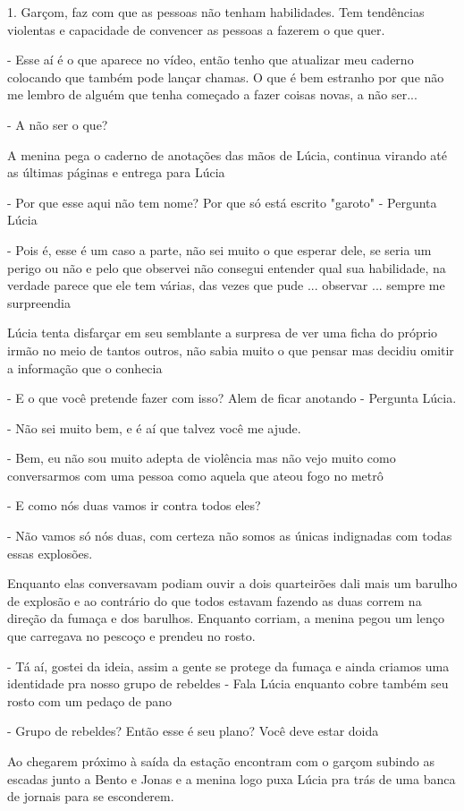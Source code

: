 1. Garçom, faz com que as pessoas não tenham habilidades. Tem tendências violentas e capacidade de convencer as pessoas a fazerem o que quer.

- Esse aí é o que aparece no vídeo, então tenho que atualizar meu caderno colocando que também pode lançar chamas. O que é bem estranho por que não me lembro de alguém que tenha começado a fazer coisas novas, a não ser...

- A não ser o que?

A menina pega o caderno de anotações das mãos de Lúcia, continua virando até as últimas páginas e entrega para Lúcia

- Por que esse aqui não tem nome? Por que só está escrito "garoto" - Pergunta Lúcia

- Pois é, esse é um caso a parte, não sei muito o que esperar dele, se seria um perigo ou não e pelo que observei não consegui entender qual sua habilidade, na verdade parece que ele tem várias, das vezes que pude ... observar ... sempre me surpreendia

Lúcia tenta disfarçar em seu semblante a surpresa de ver uma ficha do próprio irmão no meio de tantos outros, não sabia muito o que pensar mas decidiu omitir a informação que o conhecia

- E o que você pretende fazer com isso? Alem de ficar anotando - Pergunta Lúcia.

- Não sei muito bem, e é aí que talvez você me ajude.

- Bem, eu não sou muito adepta de violência mas não vejo muito como conversarmos com uma pessoa como aquela que ateou fogo no metrô

- E como nós duas vamos ir contra todos eles?

- Não vamos só nós duas, com certeza não somos as únicas indignadas com todas essas explosões.


Enquanto elas conversavam podiam ouvir a dois quarteirões dali mais um barulho de explosão e ao contrário do que todos estavam fazendo as duas correm na direção da fumaça e dos barulhos.
Enquanto corriam, a menina pegou um lenço que carregava no pescoço e prendeu no rosto.

- Tá aí, gostei da ideia, assim a gente se protege da fumaça e ainda criamos uma identidade pra nosso grupo de rebeldes - Fala Lúcia enquanto cobre também seu rosto com um pedaço de pano

- Grupo de rebeldes? Então esse é seu plano? Você deve estar doida

Ao chegarem próximo à saída da estação encontram com o garçom subindo as escadas junto a Bento e Jonas e a menina logo puxa Lúcia pra trás de uma banca de jornais para se esconderem.

